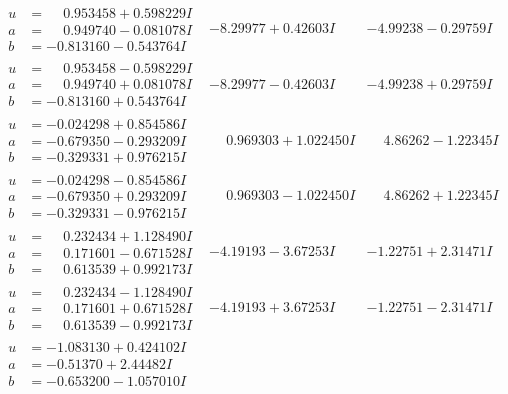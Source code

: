 \documentclass[1p]{elsarticle_modified}
\theoremstyle{definition}
\begin{document}
$$\begin{array}{c|c|c}
\begin{aligned}
u &= \phantom{-}0.953458 + 0.598229 I \\
a &= \phantom{-}0.949740 - 0.081078 I \\
b &= -0.813160 - 0.543764 I\end{aligned}
 & -8.29977 + 0.42603 I & -4.99238 - 0.29759 I \\ \hline\begin{aligned}
u &= \phantom{-}0.953458 - 0.598229 I \\
a &= \phantom{-}0.949740 + 0.081078 I \\
b &= -0.813160 + 0.543764 I\end{aligned}
 & -8.29977 - 0.42603 I & -4.99238 + 0.29759 I \\ \hline\begin{aligned}
u &= -0.024298 + 0.854586 I \\
a &= -0.679350 - 0.293209 I \\
b &= -0.329331 + 0.976215 I\end{aligned}
 & \phantom{-}0.969303 + 1.022450 I & \phantom{-}4.86262 - 1.22345 I \\ \hline\begin{aligned}
u &= -0.024298 - 0.854586 I \\
a &= -0.679350 + 0.293209 I \\
b &= -0.329331 - 0.976215 I\end{aligned}
 & \phantom{-}0.969303 - 1.022450 I & \phantom{-}4.86262 + 1.22345 I \\ \hline\begin{aligned}
u &= \phantom{-}0.232434 + 1.128490 I \\
a &= \phantom{-}0.171601 - 0.671528 I \\
b &= \phantom{-}0.613539 + 0.992173 I\end{aligned}
 & -4.19193 - 3.67253 I & -1.22751 + 2.31471 I \\ \hline\begin{aligned}
u &= \phantom{-}0.232434 - 1.128490 I \\
a &= \phantom{-}0.171601 + 0.671528 I \\
b &= \phantom{-}0.613539 - 0.992173 I\end{aligned}
 & -4.19193 + 3.67253 I & -1.22751 - 2.31471 I \\ \hline\begin{aligned}
u &= -1.083130 + 0.424102 I \\
a &= -0.51370 + 2.44482 I \\
b &= -0.653200 - 1.057010 I\end{aligned}

\end{array}$$
\end{document}
